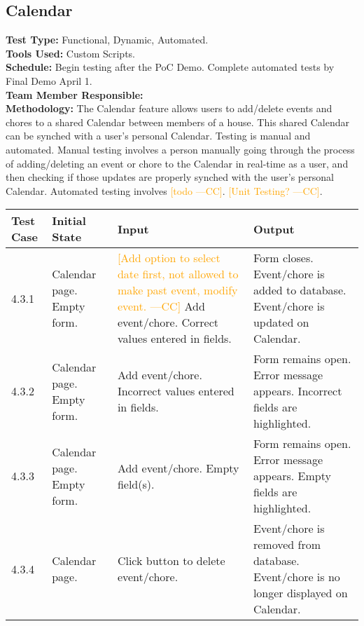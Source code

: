\documentclass[12pt]{article}
\newcommand{\authornote}[3]{\textcolor{#1}{[#3 ---#2]}}
\newcommand{\authornote}[3]{}
\newcommand{\cc}[1]{\authornote{orange}{CC}{#1}}
\begin{document}
\subsection{Calendar}
\textbf{Test Type:} Functional, Dynamic, Automated. \\
\textbf{Tools Used:} Custom Scripts. \\
\textbf{Schedule:} Begin testing after the PoC Demo. Complete automated tests by Final Demo April 1. \\
\textbf{Team Member Responsible:} \\
\textbf{Methodology:} The Calendar feature allows users to add/delete events and chores to a shared Calendar between members of a house. This shared Calendar can be synched with a user's personal Calendar. Testing is manual and automated. Manual testing involves a person manually going through the process of adding/deleting an event or chore to the Calendar in real-time as a user, and then checking if those updates are properly synched with the user's personal Calendar. Automated testing involves \cc{todo}. \cc{Unit Testing?}.

\begin{longtable}{|p{2cm}|p{3cm}|p{5cm}|p{5cm}|}
\hline
\textbf{Test Case}  & \textbf{Initial State} & \textbf{Input} & \textbf{Output} \\ \hline
4.3.1 & Calendar page. Empty form. & \cc{Add option to select date first, not allowed to make past event, modify event.} Add event/chore. Correct values entered in fields. & Form closes. Event/chore is added to database. Event/chore is updated on Calendar. \\ 
\hline
4.3.2 & Calendar page. Empty form. & Add event/chore. Incorrect values entered in fields. & Form remains open. Error message appears. Incorrect fields are highlighted. \\
\hline
4.3.3 & Calendar page. Empty form. & Add event/chore. Empty field(s). & Form remains open. Error message appears. Empty fields are highlighted. \\
\hline
4.3.4 & Calendar page. & Click button to delete event/chore.  & Event/chore is removed from database. Event/chore is no longer displayed on Calendar. \\
\hline
\end{longtable}

\end{document}
